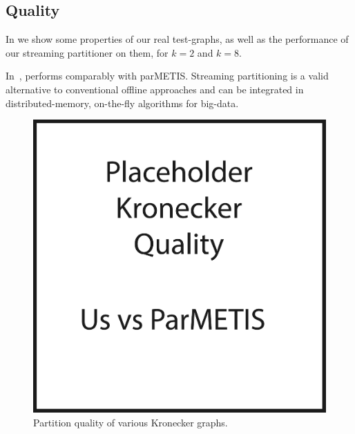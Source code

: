 \subsection{Quality}
In  we show some properties of our real test-graphs, as well as the performance of our streaming partitioner on them, for $k=2$ and $k=8$.

In~, \ourmethod performs comparably with parMETIS.  
Streaming partitioning is a valid alternative to conventional offline approaches and can be integrated in distributed-memory, on-the-fly algorithms for big-data.

\begin{figure}[h!]
\centering
  \includegraphics[width=0.8\columnwidth]{figures/kronecker_quality_tests.pdf}
  \caption{Partition quality of various Kronecker graphs.}
  \label{fig:kronqual}
\end{figure}


